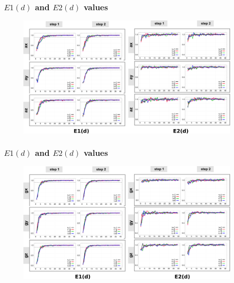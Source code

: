\documentclass{beamer}
\begin{document}
\begin{frame}
\frametitle{$E1(d)$ and $E2(d)$ values}
\vspace{-0.6cm}
\begin{figure}
\includegraphics[scale=0.07]{ev_acc} \\

\end{figure}  
\end{frame}

\begin{frame}
\frametitle{$E1(d)$ and $E2(d)$ values}
\vspace{-0.6cm}
\begin{figure}
\includegraphics[scale=0.07]{ev_gyr} \\

\end{figure}  
\end{frame}
\end{document}
